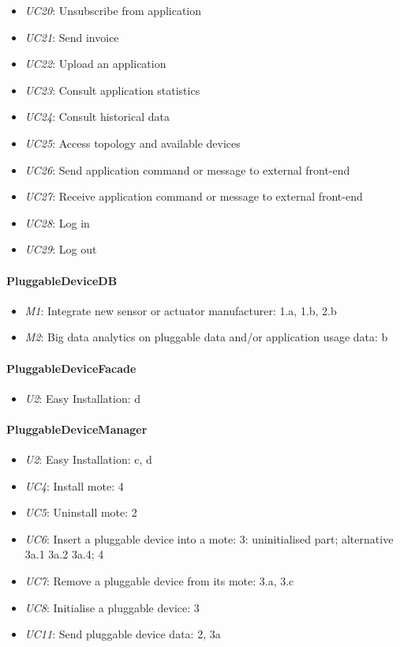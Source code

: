 \begin{itemize}
            \item \emph{UC20}: Unsubscribe from application
            \item \emph{UC21}: Send invoice
            \item \emph{UC22}: Upload an application
            \item \emph{UC23}: Consult application statistics
            \item \emph{UC24}: Consult historical data
            \item \emph{UC25}: Access topology and available devices
            \item \emph{UC26}: Send application command or message to external front-end
            \item \emph{UC27}: Receive application command or message to external front-end
            \item \emph{UC28}: Log in
            \item \emph{UC29}: Log out
        \end{itemize}

    \paragraph{PluggableDeviceDB}
        \begin{itemize}
            \item \emph{M1}: Integrate new sensor or actuator manufacturer: 1.a, 1.b, 2.b
            \item \emph{M2}: Big data analytics on pluggable data and/or application usage data: b
        \end{itemize}

    \paragraph{PluggableDeviceFacade}
        \begin{itemize}
        	\item \emph{U2}: Easy Installation: d
        \end{itemize}

    \paragraph{PluggableDeviceManager}
        \begin{itemize}
            \item \emph{U2}: Easy Installation: c, d
            \item \emph{UC4}: Install mote: 4
            \item \emph{UC5}: Uninstall mote: 2
            \item \emph{UC6}: Insert a pluggable device into a mote: 3: uninitialised part; alternative 3a.1 3a.2 3a.4; 4
            \item \emph{UC7}: Remove a pluggable device from its mote: 3.a, 3.c
            \item \emph{UC8}: Initialise a pluggable device: 3
            \item \emph{UC11}: Send pluggable device data: 2, 3a
        \end{itemize}

